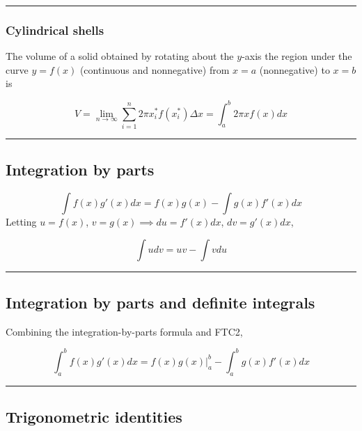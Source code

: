 \documentclass[
  landscape,  
  10pt,
]{article}
\begin{document}
\begin{multicols}{3}
\begin{center}\rule{0.5\linewidth}{0.5pt}\end{center}

\hypertarget{cylindrical-shells}{%
\subsubsection{Cylindrical shells}\label{cylindrical-shells}}

The volume of a solid obtained by rotating about the \(y\)-axis the
region under the curve \(y = f(x)\) (continuous and nonnegative) from
\(x=a\) (nonnegative) to \(x = b\) is

\[ V = \lim_{n \to\infty} \sum_{i=1}^n 2\pi x_i^* f(x_i^*) \Delta x = \int_a^b 2\pi xf(x)dx \]

\begin{center}\rule{0.5\linewidth}{0.5pt}\end{center}

\hypertarget{integration-by-parts}{%
\subsection{Integration by parts}\label{integration-by-parts}}

\[ \int f(x)g'(x)dx = f(x)g(x) - \int g(x)f'(x)dx \] Letting
\(u = f(x)\), \(v=g(x) \implies du = f'(x)dx\), \(dv = g'(x)dx\),

\[ \int udv = uv - \int vdu \]

\begin{center}\rule{0.5\linewidth}{0.5pt}\end{center}

\hypertarget{integration-by-parts-and-definite-integrals}{%
\subsection{Integration by parts and definite
integrals}\label{integration-by-parts-and-definite-integrals}}

Combining the integration-by-parts formula and FTC2,

\[ \int_a^b f(x)g'(x)dx = f(x)g(x) \Big|_a^b - \int_a^b g(x)f'(x)dx \]

\begin{center}\rule{0.5\linewidth}{0.5pt}\end{center}

\hypertarget{trigonometric-identities}{%
\subsection{Trigonometric identities}\label{trigonometric-identities}}


\end{multicols}
\end{document}
